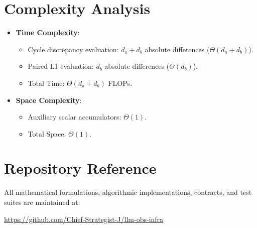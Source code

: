 \documentclass[11pt,a4paper]{article}
\theoremstyle{definition}
\begin{document}
\section{Complexity Analysis}
\begin{itemize}
    \item \textbf{Time Complexity}:
    \begin{itemize}
        \item Cycle discrepancy evaluation: $d_a + d_b$ absolute differences ($\Theta(d_a + d_b)$).
        \item Paired L1 evaluation: $d_b$ absolute differences ($\Theta(d_b)$).
        \item Total Time: $\Theta(d_a + d_b)$ FLOPs.
    \end{itemize}
    \item \textbf{Space Complexity}:
    \begin{itemize}
        \item Auxiliary scalar accumulators: $\Theta(1)$.
        \item Total Space: $\Theta(1)$.
    \end{itemize}
\end{itemize}

\section{Repository Reference}
All mathematical formulations, algorithmic implementations, contracts, and test suites are maintained at:
\begin{center}
\url{https://github.com/Chief-Strategist-J/llm-obs-infra}
\end{center}
\end{document}

